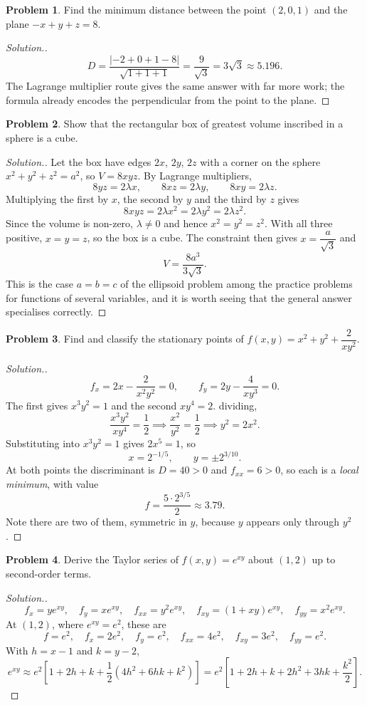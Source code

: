 \documentclass[11pt,a4paper]{article}
\theoremstyle{definition}
\newtheorem{problemx}{Problem}[subsection]
\newenvironment{problem}{\begin{problemx}}{\end{problemx}}
\newenvironment{solution}
  {\renewcommand{\qedsymbol}{}\begin{proof}[\textit{Solution}.]}
  {\end{proof}}
\begin{document}
\begin{problem}
Find the minimum distance between the point $(2,0,1)$ and the plane
$-x+y+z = 8$.
\end{problem}
\begin{solution}
\[D = \frac{\left|-2+0+1-8\right|}{\sqrt{1+1+1}}
= \frac{9}{\sqrt3} = 3\sqrt3 \approx 5.196 .\]
The Lagrange multiplier route gives the same answer with far more work; the
formula already encodes the perpendicular from the point to the plane.
\end{solution}

\begin{problem}
Show that the rectangular box of greatest volume inscribed in a sphere is a
cube.
\end{problem}
\begin{solution}
Let the box have edges $2x$, $2y$, $2z$ with a corner on the sphere
$x^2+y^2+z^2 = a^2$, so $V = 8xyz$. By Lagrange multipliers,
\[8yz = 2\lambda x,\qquad 8xz = 2\lambda y,\qquad 8xy = 2\lambda z .\]
Multiplying the first by $x$, the second by $y$ and the third by $z$ gives
\[8xyz = 2\lambda x^2 = 2\lambda y^2 = 2\lambda z^2 .\]
Since the volume is non-zero, $\lambda\neq 0$ and hence $x^2 = y^2 = z^2$. With
all three positive, $x = y = z$, so the box is a cube. The constraint then gives
$x = \dfrac{a}{\sqrt3}$ and
\[V = \frac{8a^3}{3\sqrt3}.\]
This is the case $a=b=c$ of the ellipsoid problem among the practice problems for functions of several variables, and it
is worth seeing that the general answer specialises correctly.
\end{solution}

\begin{problem}
Find and classify the stationary points of
$f(x,y) = x^2+y^2+\dfrac{2}{xy^2}$.
\end{problem}
\begin{solution}
\[f_x = 2x - \frac{2}{x^2y^2} = 0,\qquad f_y = 2y - \frac{4}{xy^3} = 0 .\]
The first gives $x^3y^2 = 1$ and the second $xy^4 = 2$. dividing,
\[\frac{x^3y^2}{xy^4} = \frac12 \implies \frac{x^2}{y^2} = \frac12
\implies y^2 = 2x^2 .\]
Substituting into $x^3y^2 = 1$ gives $2x^5 = 1$, so
\[x = 2^{-1/5},\qquad y = \pm 2^{3/10}.\]
At both points the discriminant is $D = 40 > 0$ and $f_{xx} = 6 > 0$, so each is
a \emph{local minimum}, with value
\[f = \frac{5\cdot 2^{3/5}}{2}\approx 3.79 .\]
Note there are two of them, symmetric in $y$, because $y$ appears only through
$y^2$.
\end{solution}

\begin{problem}
Derive the Taylor series of $f(x,y) = e^{xy}$ about $(1,2)$ up to second-order
terms.
\end{problem}
\begin{solution}
\[f_x = ye^{xy},\quad f_y = xe^{xy},\quad
f_{xx} = y^2e^{xy},\quad f_{xy} = (1+xy)e^{xy},\quad f_{yy} = x^2e^{xy}.\]
At $(1,2)$, where $e^{xy} = e^2$, these are
\[f = e^2,\quad f_x = 2e^2,\quad f_y = e^2,\quad
f_{xx} = 4e^2,\quad f_{xy} = 3e^2,\quad f_{yy} = e^2 .\]
With $h = x-1$ and $k = y-2$,
\[e^{xy} \approx e^2\left[1 + 2h + k + \frac12(4h^2 + 6hk + k^2)\right]
= e^2\left[1 + 2h + k + 2h^2 + 3hk + \frac{k^2}{2}\right].\]
\end{solution}
\end{document}
